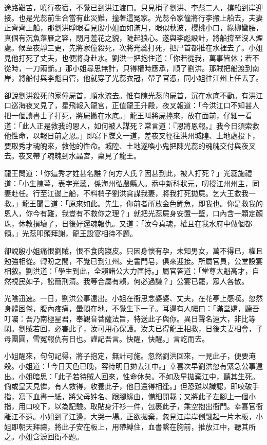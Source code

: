 途路艱苦，曉行夜宿，不覺已到洪江渡口。只見梢子劉洪、李彪二人，撐船到岸迎接。也是光蕊前生合當有此災難，撞著這冤家。光蕊令家僮將行李搬上船去，夫妻正齊齊上船，那劉洪睜眼看見殷小姐面如滿月，眼似秋波，櫻桃小口，綠柳蠻腰，真個有沉魚落雁之容，閉月羞花之貌，陡起狼心。遂與李彪設計，將船撐至沒人煙處。候至夜靜三更，先將家僮殺死，次將光蕊打死，把尸首都推在水裡去了。小姐見他打死了丈夫，也便將身赴水。劉洪一把抱住道：「你若從我，萬事皆休；若不從時，一刀兩斷。」那小姐尋思無計，只得權時應承，順了劉洪。那賊把船渡到南岸，將船付與李彪自管，他就穿了光蕊衣冠，帶了官憑，同小姐往江州上任去了。

卻說劉洪殺死的家僮屍首，順水流去。惟有陳光蕊的屍首，沉在水底不動。有洪江口巡海夜叉見了，星飛報入龍宮，正值龍王升殿，夜叉報道：「今洪江口不知甚人把一個讀書士子打死，將屍撇在水底。」龍王叫將屍擡來，放在面前，仔細一看道：「此人正是救我的恩人，如何被人謀死？常言道：『恩將恩報。』我今日須索救他性命，以報日前之恩。」即寫下牒文一道，差夜叉徑往洪州城隍、土地處投下，要取秀才魂魄來，救他的性命。城隍、土地遂喚小鬼把陳光蕊的魂魄交付與夜叉去。夜叉帶了魂魄到水晶宮，稟見了龍王。

龍王問道：「你這秀才姓甚名誰？何方人氏？因甚到此，被人打死？」光蕊施禮道：「小生陳萼，表字光蕊，係海州弘農縣人。忝中新科狀元，叨授江州州主，同妻赴任。行至江邊上船，不料梢子劉洪貪謀我妻，將我打死拋屍。乞大王救我一救。」龍王聞言道：「原來如此。先生，你前者所放金色鯉魚，即我也。你是救我的恩人，你今有難，我豈有不救你之理？」就把光蕊屍身安置一壁，口內含一顆定顏珠，休教損壞了，日後好還魂報仇。又道：「汝今真魂，權且在我水府中做個都領。」光蕊叩頭拜謝，龍王設宴相待不題。

卻說殷小姐痛恨劉賊，恨不食肉寢皮。只因身懷有孕，未知男女，萬不得已，權且勉強相從。轉盼之間，不覺已到江州。吏書門皂，俱來迎接。所屬官員，公堂設宴相敘。劉洪道：「學生到此，全賴諸公大力匡持。」屬官答道：「堂尊大魁高才，自然視民如子，訟簡刑清。我等合屬有賴，何必過謙？」公宴已罷，眾人各散。

光陰迅速。一日，劉洪公事遠出。小姐在衙思念婆婆、丈夫，在花亭上感嘆。忽然身體困倦，腹內疼痛，暈悶在地，不覺生下一子。耳邊有人囑曰：「滿堂嬌，聽吾叮囑：吾乃南極星君，奉觀音菩薩法旨，特送此子與你。異日聲名遠大，非比等閑。劉賊若回，必害此子，汝可用心保護。汝夫已得龍王相救，日後夫妻相會，子母團圓，雪冤報仇有日也。謹記吾言。快醒，快醒。」言訖而去。

小姐醒來，句句記得，將子抱定，無計可施。忽然劉洪回來，一見此子，便要淹殺。小姐道：「今日天色已晚，容待明日拋去江中。」幸喜次早劉洪忽有緊急公事遠出。小姐暗思：「此子若待賊人回來，性命休矣。不如及早拋棄江中，聽其生死。倘或皇天見憐，有人救得，收養此子，他日還得相逢。」但恐難以識認，即咬破手指，寫下血書一紙，將父母姓名、跟腳緣由，備細開載；又將此子左腳上一個小指，用口咬下，以為記驗。取貼身汗衫一件，包裹此子，乘空抱出衙門。幸喜官衙離江不遠。小姐到了江邊，大哭一場。正欲拋棄，忽見江岸岸側飄起一片木板，小姐即朝天拜禱，將此子安在板上，用帶縛住，血書繫在胸前，推放江中，聽其所之。小姐含淚回衙不題。

